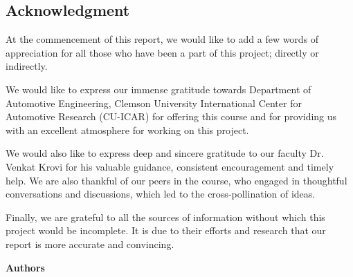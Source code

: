 \begin{titlepage}

    \pagebreak

    \section*{Acknowledgment}\label{Acknowledgment}
    \thispagestyle{empty}

    At the commencement of this report, we would like to add a few words of appreciation for all those who have been a part of this project; directly or indirectly.
    
    We would like to express our immense gratitude towards Department of Automotive Engineering, Clemson University International Center for Automotive Research (CU-ICAR) for offering this course and for providing us with an excellent atmosphere for working on this project.
    
    We would also like to express deep and sincere gratitude to our faculty Dr. Venkat Krovi for his valuable guidance, consistent encouragement and timely help. We are also thankful of our peers in the course, who engaged in thoughtful conversations and discussions, which led to the cross-pollination of ideas.
    
    Finally, we are grateful to all the sources of information without which this project would be incomplete. It is due to their efforts and research that our report is more accurate and convincing.

    \begin{flushright}
    \textbf{Authors}
    \end{flushright}

    \pagebreak

    \thispagestyle{empty}
    \tableofcontents
    \thispagestyle{empty}
    
    \pagebreak
    
\end{titlepage}